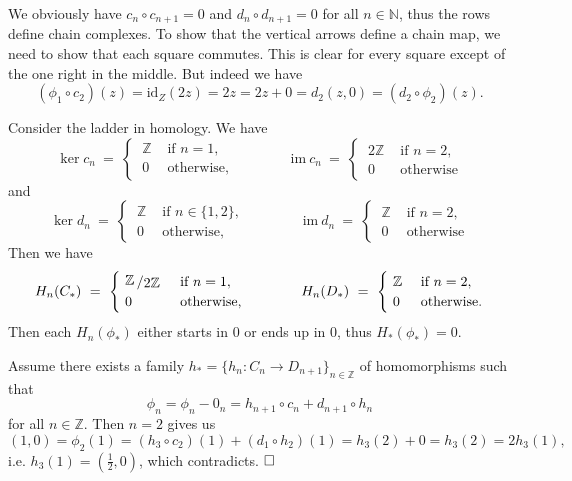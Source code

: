 \documentclass[11pt]{book}
\numberwithin{dummy}{section}
\theoremstyle{nonumberbreak}
\newenvironment{sol}[1][]{\ifthenelse{\equal{#1}{}}{\solution}{\solution[#1]}\rm}{\endsolution}
\newenvironment{prob}[1][]{\ifthenelse{\equal{#1}{}}{\problem}{\problem[#1]}\rm}{\endproblem}
\newcommand{\la}{\longrightarrow}
\newcommand{\id}{\mathrm{id}}
\newcommand{\Z}{\mathbb{Z}}
\newcommand{\slant}[2]{{\raisebox{.1em}{$#1$}\left/\raisebox{-.1em}{$#2$}\right.}}
\begin{document}
\begin{spacing}{1.4}
\begin{prob}
\begin{sol}
\begin{compactenum}
\item We obviously have $c_n \circ c_{n+1}= 0$ and $d_n \circ d_{n+1}=0$ for all $n \in \mathbb{N}$, thus the rows define chain complexes. To show that the vertical arrows define a chain map, we need to show that each square commutes. This is clear for every square except of the one right in the middle. But indeed we have 
$$(\phi_1 \circ c_2)(z) = \id_Z(2z) = 2z = 2z+0 = d_2(z,0) = (d_2 \circ \phi_2)(z).$$
\item Consider the ladder in homology. We have
$$\ker c_n  \ = \ \begin{cases} \ \Z & \textrm{ if }n=1, \\ \ 0 & \textrm{ otherwise,} \end{cases} \qquad \qquad \mathrm{im} \ c_n \ = \ \begin{cases} \ 2 \Z & \textrm{ if } n=2, \\ \ 0 & \textrm{ otherwise} \end{cases}$$
and 
$$\ker d_n  \ = \ \begin{cases} \ \Z & \textrm{ if }n\in \{1,2\}, \\ \ 0 & \textrm{ otherwise,} \end{cases} \qquad \qquad \mathrm{im} \ d_n \ = \ \begin{cases} \ \Z & \textrm{ if } n=2, \\ \ 0 & \textrm{ otherwise} \end{cases}$$
Then we have 
$$H_n(C_*) \ = \ \begin{cases} \ \slant{\Z}{2\Z} & \textrm{ if } n=1, \\ \ 0 & \textrm{ otherwise,} \end{cases} \qquad \qquad H_n(D_*) \ = \ \begin{cases} \ \Z & \textrm{ if }n=2, \\ \ 0 & \textrm{ otherwise.} \end{cases} $$
Then each $H_n(\phi_*)$ either starts in $0$ or ends up in $0$, thus $H_*(\phi_*)=0$. 
\item Assume there exists a family $h_* = \{h_n: C_n \la D_{n+1}\}_{n \in \Z}$ of homomorphisms such that
$$\phi_n = \phi_n - 0_n = h_{n+1} \circ c_n + d_{n+1} \circ h_n$$
for all $n \in \Z$. Then $n=2$ gives us 
$$(1,0) = \phi_2(1) = (h_3 \circ c_2)(1) + (d_1 \circ h_2)(1) = h_3(2) + 0 = h_3(2) = 2 h_3(1),$$
i.e. $h_3(1) = \left(\frac{1}{2},0\right)$, which contradicts. $\hfill \Box$


\end{compactenum}
\end{sol}
\end{prob}
\end{spacing}
\end{document}
